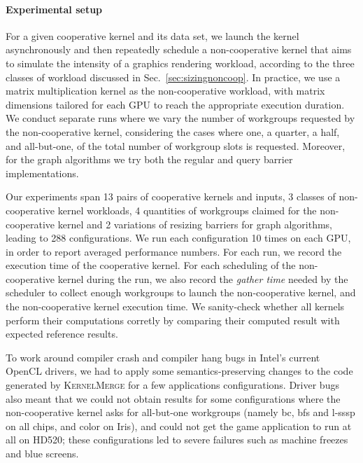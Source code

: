 \documentclass[numbers,nocopyrightspace,10pt]{sigplanconf}
\newcommand{\kernelmerge}{\textsc{KernelMerge}}
\newcommand{\mysec}{Sec.~}
\begin{document}

\paragraph{Experimental setup}
For a given cooperative kernel and its data set, we launch the kernel
asynchronously and then repeatedly schedule a non-cooperative kernel
that aims to simulate the intensity of a graphics rendering workload,
according to the three classes of workload discussed in \mysec\ref{sec:sizingnoncoop}. In
practice, we use a matrix multiplication kernel as the non-cooperative
workload, with matrix dimensions tailored for each GPU to reach the
appropriate execution duration.  We conduct separate runs where we vary
the number of workgroups requested by the non-cooperative kernel,
considering the cases where one, a quarter, a half, and all-but-one, of
the total number of workgroup slots is requested.  Moreover, for the
graph algorithms we try both the regular and query barrier
implementations.

Our experiments span 13 pairs of cooperative kernels and inputs, 3
classes of non-cooperative kernel workloads, 4 quantities of workgroups
claimed for the non-cooperative kernel and 2 variations of resizing
barriers for graph algorithms, leading to 288 configurations.  We run
each configuration 10 times on each GPU, in order to report averaged
performance numbers. For each run, we record the execution time of the
cooperative kernel. For each scheduling of the non-cooperative kernel
during the run, we also record the \emph{gather time} needed by the
scheduler to collect enough workgroups to launch the non-cooperative
kernel, and the non-cooperative kernel execution time. We sanity-check
whether all kernels perform their computations corretly by comparing
their computed result with expected reference results.

To work around compiler crash and compiler hang bugs in Intel's current
OpenCL drivers, we had to apply some semantics-preserving changes to the
code generated by \kernelmerge{} for a few applications configurations.
Driver bugs also meant that we could not obtain results for some configurations where the
non-cooperative kernel asks for all-but-one workgroups (namely bc, bfs
and l-sssp on all chips, and color on Iris), and could not get the game
application to run at all on HD520; these configurations led to
severe failures such as machine freezes and blue screens.
\end{document}
